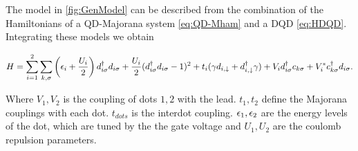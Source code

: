 










 The model in \ref{fig:GenModel} can be described from the combination of the Hamiltonians of a QD-Majorana system \eqref{eq:QD-Mham} and a DQD \eqref{eq:HDQD}. Integrating these models we obtain

\begin{equation}
H =\sum_{i=1}^2\sum_{k,\sigma}\left(\epsilon_{i}+\frac{U_i}{2}\right)d_{i\sigma}^{\dagger}d_{i\sigma}+ \frac{U_i}{2}(d_{i \sigma}^{\dagger}d_{i \sigma}-1)^{2} + t_i(\gamma d_{i,\downarrow}+d^\dagger_{i,\downarrow}\gamma) + V_id^\dagger_{i\sigma}c_{k\sigma}+V_i^* c^\dagger_{k\sigma}d_{i\sigma}.
\label{eq:Generalmodel}
\end{equation}

Where $V_1,V_2$ is the coupling of dots $1,2$ with the lead. $t_1,t_2$ define the Majorana couplings with each dot. $t_{dots}$ is the interdot coupling. $\epsilon_1,\epsilon_2$ are the energy levels of the dot, which are tuned by the the gate voltage and $U_1,U_2$ are the coulomb repulsion parameters. 



